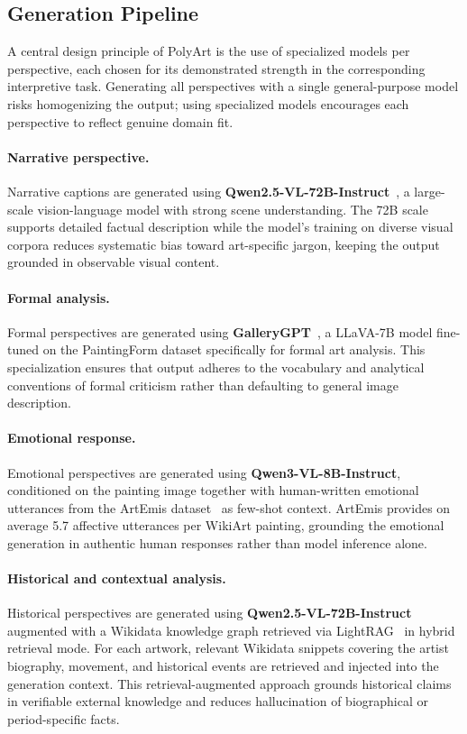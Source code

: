 \subsection{Generation Pipeline}

A central design principle of PolyArt is the use of specialized models per perspective, each chosen for its demonstrated strength in the corresponding interpretive task.
Generating all perspectives with a single general-purpose model risks homogenizing the output; using specialized models encourages each perspective to reflect genuine domain fit.

\paragraph{Narrative perspective.}
Narrative captions are generated using \textbf{Qwen2.5-VL-72B-Instruct}~\cite{qwen25vl}, a large-scale vision-language model with strong scene understanding.
The 72B scale supports detailed factual description while the model's training on diverse visual corpora reduces systematic bias toward art-specific jargon, keeping the output grounded in observable visual content.

\paragraph{Formal analysis.}
Formal perspectives are generated using \textbf{GalleryGPT}~\cite{MM24GalleryGPT}, a LLaVA-7B model fine-tuned on the PaintingForm dataset specifically for formal art analysis.
This specialization ensures that output adheres to the vocabulary and analytical conventions of formal criticism rather than defaulting to general image description.

\paragraph{Emotional response.}
Emotional perspectives are generated using \textbf{Qwen3-VL-8B-Instruct}, conditioned on the painting image together with human-written emotional utterances from the ArtEmis dataset~\cite{achlioptas2021artemis} as few-shot context.
ArtEmis provides on average 5.7 affective utterances per WikiArt painting, grounding the emotional generation in authentic human responses rather than model inference alone.

\paragraph{Historical and contextual analysis.}
Historical perspectives are generated using \textbf{Qwen2.5-VL-72B-Instruct} augmented with a Wikidata knowledge graph retrieved via LightRAG~\cite{lightrag2024} in hybrid retrieval mode.
For each artwork, relevant Wikidata snippets covering the artist biography, movement, and historical events are retrieved and injected into the generation context.
This retrieval-augmented approach grounds historical claims in verifiable external knowledge and reduces hallucination of biographical or period-specific facts.

